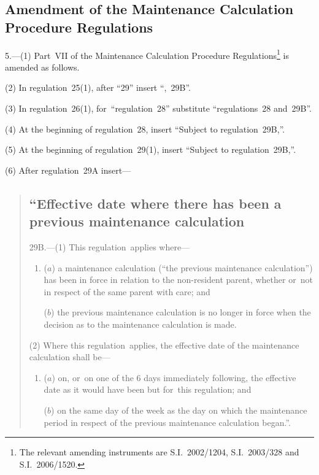 \documentclass[12pt,a4paper]{article}
\begin{document}
\subsection[5. Amendment of the Maintenance Calculation Procedure Regulations]{Amendment of the Maintenance Calculation Procedure Regulations}

5.---(1)  Part~VII of the Maintenance Calculation Procedure Regulations\footnote{The relevant amending instruments are S.I.~2002/1204, S.I.~2003/328 and S.I.~2006/1520.} is amended as follows.

(2) In regulation~25(1), after “29” insert “,~29B”.

(3) In regulation~26(1), for~“regulation~28” substitute “regulations~28 and~29B”.

(4) At the beginning of regulation~28, insert “Subject to regulation~29B,”.

(5) At the beginning of regulation~29(1), insert “Subject to regulation~29B,”.

(6) After regulation~29A insert—
\begin{quotation}
\subsection*{“Effective date where there has been a previous maintenance calculation}

29B.---(1)  This regulation~applies where—
\begin{enumerate}\item[]
($a$) a maintenance calculation (“the previous maintenance calculation”) has been in force in relation to the non-resident parent, whether or~not in respect of the same parent with care; and

($b$) the previous maintenance calculation is no longer in force when the decision as to the maintenance calculation is made.
\end{enumerate}

(2) Where this regulation~applies, the effective date of the maintenance calculation shall be—
\begin{enumerate}\item[]
($a$) on, or~on one of the 6 days immediately following, the effective date as it would have been but for~this regulation; and

($b$) on the same day of the week as the day on which the maintenance period in respect of the previous maintenance calculation began.”.
\end{enumerate}
\end{quotation}
\end{document}

